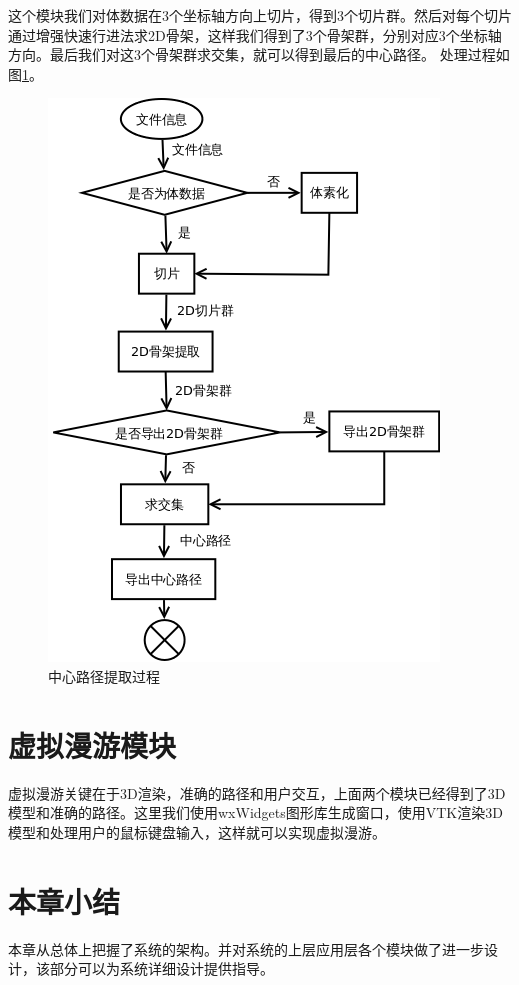 这个模块我们对体数据在3个坐标轴方向上切片，得到3个切片群。然后对每个切片通过增强快速行进法求2D骨架，这样我们得到了3个骨架群，分别对应3个坐标轴方向。最后我们对这3个骨架群求交集，就可以得到最后的中心路径。
处理过程如图\ref{process_skel_extract}。
\begin{figure}[h!]
    \centering
    \includegraphics[width=300bp]{figure/process_skel_extract.png}
    \caption{中心路径提取过程}
    \label{process_skel_extract}
\end{figure}

\section{虚拟漫游模块}
虚拟漫游关键在于3D渲染，准确的路径和用户交互，上面两个模块已经得到了3D模型和准确的路径。这里我们使用wxWidgets图形库生成窗口，使用VTK渲染3D模型和处理用户的鼠标键盘输入，这样就可以实现虚拟漫游。

\section{本章小结}
本章从总体上把握了系统的架构。并对系统的上层应用层各个模块做了进一步设计，该部分可以为系统详细设计提供指导。
